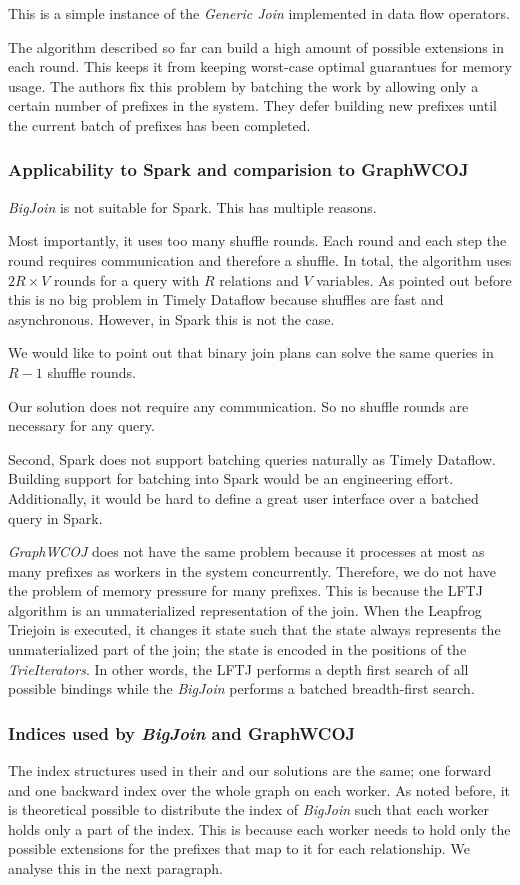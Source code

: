 This is a simple instance of the \textit{Generic Join} implemented in data flow operators.

The algorithm described so far can build a high amount of possible extensions in each round.
This keeps it from keeping worst-case optimal guarantues for memory usage.
The authors fix this problem by batching the work by allowing only a certain number of prefixes in the system.
They defer building new prefixes until the current batch of prefixes has been completed.

\subsubsection{Applicability to Spark and comparision to GraphWCOJ}
\textit{BigJoin} is not suitable for Spark.
This has multiple reasons.

Most importantly, it uses too many shuffle rounds.
Each round and each step the round requires communication and therefore a shuffle.
In total, the algorithm uses $2R \times V$ rounds for a query with $R$ relations and $V$ variables.
As pointed out before this is no big problem in Timely Dataflow because shuffles are fast and asynchronous.
However, in Spark this is not the case.

We would like to point out that binary join plans can solve the same queries in $R - 1$ shuffle rounds.

Our solution does not require any communication.
So no shuffle rounds are necessary for any query.

Second, Spark does not support batching queries naturally as Timely Dataflow.
Building support for batching into Spark would be an engineering effort.
Additionally, it would be hard to define a great user interface over a batched query in Spark.

\textit{GraphWCOJ} does not have the same problem because it processes at most as many prefixes as workers in the system concurrently.
Therefore, we do not have the problem of memory pressure for many prefixes.
This is because the \textsc{LFTJ} algorithm is an unmaterialized representation of the join.
When the Leapfrog Triejoin is executed, it changes it state such that the state always represents the unmaterialized
part of the join;
the state is encoded in the positions of the \textit{TrieIterators}.
In other words, the \textsc{LFTJ} performs a depth first search of all possible bindings while the \textit{BigJoin}
performs a batched breadth-first search.

\subsubsection{Indices used by \textit{BigJoin} and GraphWCOJ}
The index structures used in their and our solutions are the same; one forward and one backward index over the whole graph on each
worker.
As noted before, it is theoretical possible to distribute the index of \textit{BigJoin} such that each worker holds only a part
of the index.
This is because each worker needs to hold only the possible extensions for the prefixes that map to it for each relationship.
We analyse this in the next paragraph.

